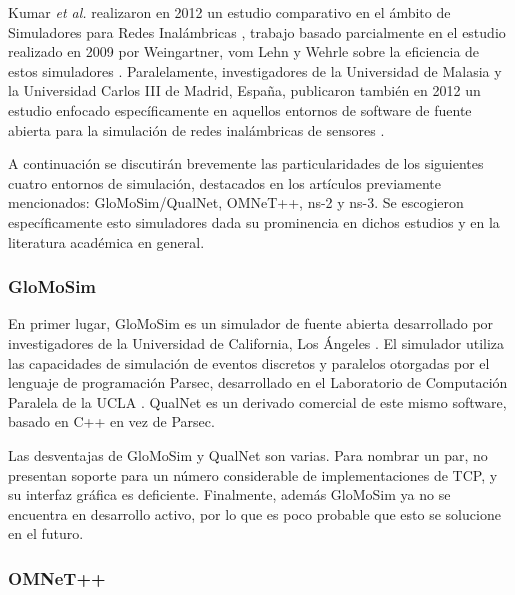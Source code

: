 Kumar \emph{et al.} realizaron en 2012 un estudio comparativo en el ámbito de Simuladores para Redes Inalámbricas \autocite{networksimcomparativestudy}, trabajo basado parcialmente en el estudio realizado en 2009 por Weingartner, vom Lehn y Wehrle sobre la eficiencia de estos simuladores \autocite{perf_comp_recentnetworksims}. Paralelamente, investigadores de la Universidad de Malasia y la Universidad Carlos III de Madrid, España, publicaron también en 2012 un estudio enfocado específicamente en aquellos entornos de software de fuente abierta para la simulación de redes inalámbricas de sensores \autocite{perf_comp_opensourcenetworksims}.

A continuación se discutirán brevemente las particularidades de los siguientes cuatro entornos de simulación, destacados en los artículos previamente mencionados: GloMoSim/QualNet, OMNeT++, ns-2 y ns-3. Se escogieron específicamente esto simuladores dada su prominencia en dichos estudios y en la literatura académica en general.
 
\subsubsection{GloMoSim}

En primer lugar, GloMoSim es un simulador de fuente abierta desarrollado por investigadores de la Universidad de California, Los Ángeles \autocite{glomosim}. El simulador utiliza las capacidades de simulación de eventos discretos y paralelos otorgadas por el lenguaje de programación Parsec, desarrollado en el Laboratorio de Computación Paralela de la UCLA \autocite{parsec}. QualNet es un derivado comercial de este mismo software, basado en C++ en vez de Parsec. 

Las desventajas de GloMoSim y QualNet son varias. Para nombrar un par, no presentan soporte para un número considerable de implementaciones de TCP, y su interfaz gráfica es deficiente. Finalmente, además GloMoSim ya no se encuentra en desarrollo activo, por lo que es poco probable que esto se solucione en el futuro.

\subsubsection{OMNeT++}

